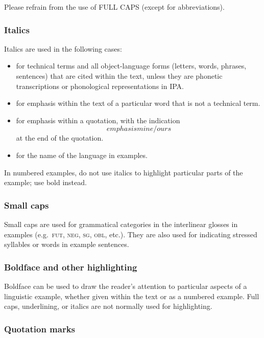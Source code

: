\documentclass[cm,linguex]{glossa}
\begin{document}
Please refrain from the use of FULL CAPS (except for abbreviations).

\hypertarget{italics}{%
\subsubsection{Italics}\label{italics}}

Italics are used in the following cases:

\begin{itemize}
\item
  for technical terms and all object-language forms (letters, words,
  phrases, sentences) that are cited within the text, unless they are
  phonetic transcriptions or phonological representations in IPA.
\item
  for emphasis within the text of a particular word that is not a
  technical term.
\item
  for emphasis within a quotation, with the indication \[emphasis
  mine/ours\] at the end of the quotation.
\item
  for the name of the language in examples.
\end{itemize}

In numbered examples, do not use italics to highlight particular parts
of the example; use bold instead.

\hypertarget{small-caps}{%
\subsubsection{Small caps}\label{small-caps}}

Small caps are used for grammatical categories in the interlinear
glosses in examples (e.g.~\textsc{fut, neg, sg, obl}, etc.). They are
also used for indicating stressed syllables or words in example
sentences.

\hypertarget{boldface-and-other-highlighting}{%
\subsubsection{Boldface and other
highlighting}\label{boldface-and-other-highlighting}}

Boldface can be used to draw the reader's attention to particular
aspects of a linguistic example, whether given within the text or as a
numbered example. Full caps, underlining, or italics are not normally
used for highlighting.

\hypertarget{quotation-marks}{%
\subsubsection{Quotation marks}\label{quotation-marks}}
\end{document}
